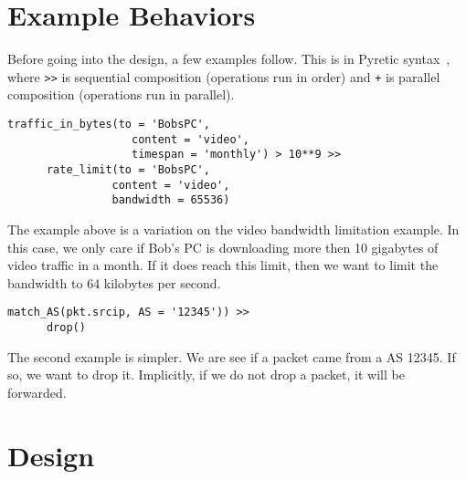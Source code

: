 \documentclass{sig-alternate}
\newcommand\tti[1]{\small\texttt{#1}\normalsize}
\newcommand\system{NetAssay}
\begin{document}
\section{Example Behaviors}
\label{sec:examples}
Before going into the design, a few examples follow. This is in Pyretic syntax~\cite{pyretic}, where \tti{>}\tti{>} is sequential composition (operations run in order) and \tti{+} is parallel composition (operations run in parallel). 

\begin{Verbatim}[fontsize=\small]
  traffic_in_bytes(to = 'BobsPC', 
                   content = 'video',
                   timespan = 'monthly') > 10**9 >>
      rate_limit(to = 'BobsPC', 
                content = 'video', 
                bandwidth = 65536)
\end{Verbatim}

The example above is a variation on the video bandwidth limitation example. In this case, we only care if Bob's PC is downloading more then 10 gigabytes of video traffic in a month. If it does reach this limit, then we want to limit the bandwidth to 64 kilobytes per second.

\begin{Verbatim}[fontsize=\small]
  match_AS(pkt.srcip, AS = '12345')) >>
      drop()
\end{Verbatim}

The second example is simpler. We are see if a packet came from a AS 12345. If so, we want to drop it. Implicitly, if we do not drop a packet, it will be forwarded.


\section{Design}

\end{document}
